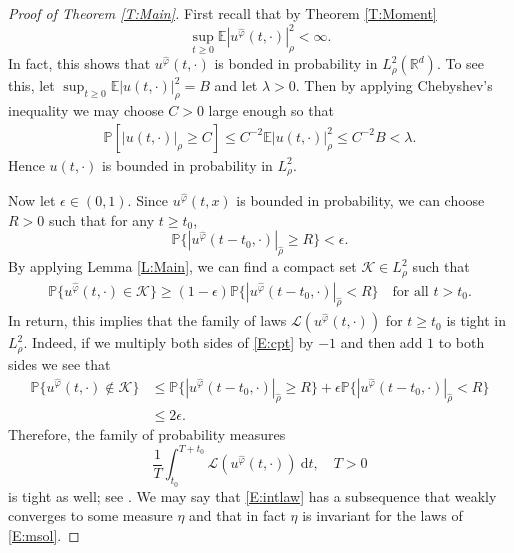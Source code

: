 \documentclass[a4paper,11pt]{article}%
\numberwithin{equation}{section}
\theoremstyle{plain}
\theoremstyle{definition}
\newcommand{\R}{\mathbb{R}}
\newcommand{\E}{\mathbb{E}}
\newcommand{\ud}{\ensuremath{ \mathrm{d} }}
\begin{document}
 \begin{proof}[Proof of Theorem \ref{T:Main}]
 	First recall that by Theorem \ref{T:Moment}
 		\begin{equation} \label{E:bipc}
 			\sup_{t \ge 0} \E |u^{\hat{\varphi}}(t,\cdot)|_\rho^2 < \infty.
 		 \end{equation}
 	In fact, this shows that $u^{\hat{\varphi}}(t,\cdot)$ is bonded in probability in $L^2_{\rho}(\R^d)$. To see this, let $\sup_{t\ge 0} \E |u(t,\cdot)|_\rho^2 = B$ and let $\lambda >0$.
 	Then by applying Chebyshev's inequality we may choose $C>0$ large enough so that
 	\begin{align*}
 	\mathbb{P}[|u(t,\cdot)|_\rho \ge C] \le C^{-2}\E |u(t,\cdot)|_\rho^2 \le C^{-2}B < \lambda.
 	\end{align*}
 	Hence $u(t,\cdot)$ is bounded in probability in $L^2_{\rho}$.

 	Now let $\epsilon \in (0,1)$. Since $u^{\hat\varphi}(t,x)$ is bounded in probability, we can choose $R>0$ such that for any $t \ge t_0$,
 		\[
 			\mathbb{P}\{|u^{\hat \varphi}(t-t_0,\cdot)|_{\widehat{\rho}} \ge R\} < \epsilon.
 		\]
 	By applying Lemma \ref{L:Main}, we can find a compact set $\mathscr K \in L^2_{\rho}$ such that
 	\begin{align*}
 	\mathbb{P}\{u^{\hat \varphi}(t,\cdot) \in \mathscr K \} \ge (1-\epsilon)\mathbb{P}\{|u^{\hat \varphi}(t-t_0,\cdot)|_{\widehat{\rho}} < R\} \quad \text{for all $t>t_0$} .
 	\end{align*}
 	In return, this implies that the family of laws $\mathscr L(u^{\hat \varphi}(t,\cdot))$ for $t \ge t_0$ is tight in $L^2_{\rho}$. Indeed, if we multiply both sides of \eqref{E:cpt} by $-1$ and then add $1$ to both sides we see that
 		\begin{align*}
 			\mathbb{P}\{u^{\hat \varphi}(t,\cdot) \not\in \mathscr K \} &\le \mathbb{P}\{|u^{\hat \varphi}(t-t_0,\cdot)|_{\widehat{\rho}} \ge R\} + \epsilon \mathbb{P}\{ |u^{\hat \varphi}(t-t_0,\cdot)|_{\widehat{\rho}} < R \}
 			\\& \le 2 \epsilon.
 		\end{align*}
 	Therefore, the family of probability measures
 	\begin{equation}
 	\label{E:intlaw}
 	\dfrac{1}{T}\int_{t_0}^{T+t_0} \mathscr L(u^{\hat \varphi}(t,\cdot))\: \ud t, \quad T>0
 	\end{equation}
 	is tight as well; see \cite[Corollary 3.1.2]{DZ96}.
 	We may say that \eqref{E:intlaw} has a subsequence that weakly converges to some measure $\eta$ and that in fact $\eta$
 	is invariant for the laws of \eqref{E:msol}.
 \end{proof}
\end{document}
